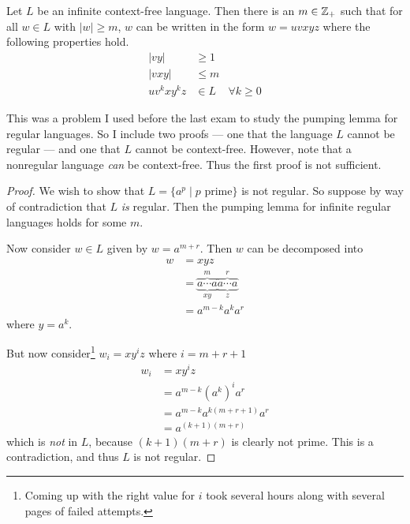 \documentclass{article}
\begin{document}
\begin{lemma}
    Let $L$ be an infinite context-free language.
    Then there is an $m \in \mathbb{Z}_+$ such that for all $w \in L$ with $\vert w \vert \geq m$, $w$ can be written in the form $w = uvxyz$ where the following properties hold.
    \begin{align*}
        \vert vy \vert  & \geq 1                    \\
        \vert vxy \vert & \leq m                    \\
        u v^k x y^k z   & \in L  & \forall k \geq 0
    \end{align*}
\end{lemma}

This was a problem I used before the last exam to study the pumping lemma for regular languages.
So I include two proofs --- one that the language $L$ cannot be regular --- and one that $L$ cannot be context-free.
However, note that a nonregular language \textit{can} be context-free.
Thus the first proof is not sufficient.

\begin{proof}
    We wish to show that $L = \{a^p \mid p \text{ prime}\}$ is not regular.
    So suppose by way of contradiction that $L$ \textit{is} regular.
    Then the pumping lemma for infinite regular languages holds for some $m$.

    Now consider $w \in L$ given by $w = a^{m + r}$.
    Then $w$ can be decomposed into
    \begin{align*}
        w & = xyz                                                                               \\
          & = \underbrace{\overbrace{a \cdots a}^m}_{xy}\underbrace{\overbrace{a \cdots a}^r}_z \\
          & = a^{m - k} a^k a^r
    \end{align*}
    where $y = a^k$.

    But now consider\footnote{Coming up with the right value for $i$ took several hours along with several pages of failed attempts.} $w_i = xy^i z$ where $i = m + r + 1$
    \begin{align*}
        w_i & = xy^i z                         \\
            & = a^{m - k} {(a^k)}^i a^r        \\
            & = a^{m - k} a^{k(m + r + 1)} a^r \\
            & = a^{(k + 1)(m + r)}
    \end{align*}
    which is \textit{not} in $L$, because $(k + 1)(m + r)$ is clearly\texttrademark{} not prime.
    This is a contradiction, and thus $L$ is not regular.
\end{proof}
\end{document}
